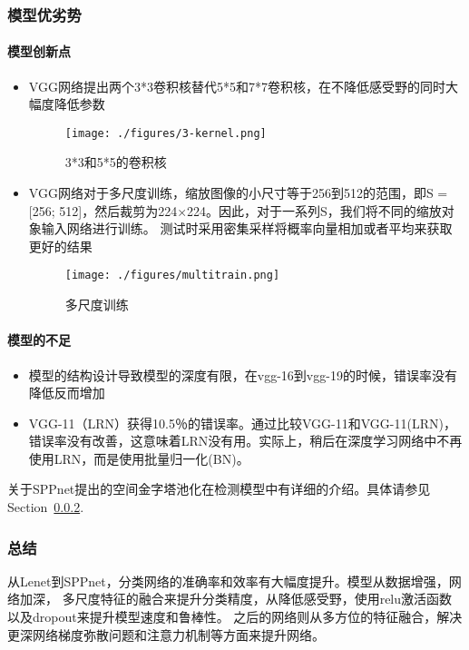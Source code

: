 \documentclass{article}
\newcommand{\tao}[1]{\todo[color=red!20,size=\footnotesize]{T: #1}{}}
\begin{document}
\begin{CJK}{UTF8}{gbsn}
\subsubsection{模型优劣势}
\paragraph{模型创新点}
\begin{itemize}
\item VGG网络提出两个3*3卷积核替代5*5和7*7卷积核，在不降低感受野的同时大幅度降低参数

    \begin{figure}[!h]
        \centering
        \texttt{[image: ./figures/3-kernel.png]}
        \caption{3*3和5*5的卷积核}
        \label{fig:3-kernel}
    \end{figure}

\item VGG网络对于多尺度训练，缩放图像的小尺寸等于256到512的范围，即S = [256; 512]，然后裁剪为224×224。因此，对于一系列S，我们将不同的缩放对象输入网络进行训练。
测试时采用密集采样将概率向量相加或者平均来获取更好的结果

    \begin{figure}[!h]
    \centering
    \texttt{[image: ./figures/multitrain.png]}
    \caption{多尺度训练}
    \label{fig:multitrain}
    \end{figure}

\end{itemize}


\paragraph{模型的不足}
\begin{itemize}
\item 模型的结构设计导致模型的深度有限，在vgg-16到vgg-19的时候，错误率没有降低反而增加
\item VGG-11（LRN）获得10.5％的错误率。通过比较VGG-11和VGG-11(LRN)，错误率没有改善，这意味着LRN没有用。实际上，稍后在深度学习网络中不再使用LRN，而是使用批量归一化(BN)。
\end{itemize}

关于SPPnet提出的空间金字塔池化在检测模型中有详细的介绍。具体请参见Section~\ref{}.
    

\subsubsection{总结}
从Lenet到SPPnet，分类网络的准确率和效率有大幅度提升。模型从数据增强，网络加深，
多尺度特征的融合来提升分类精度，从降低感受野，使用relu激活函数以及dropout来提升模型速度和鲁棒性。
之后的网络则从多方位的特征融合，解决更深网络梯度弥散问题和注意力机制等方面来提升网络。



\end{CJK}
\end{document}
